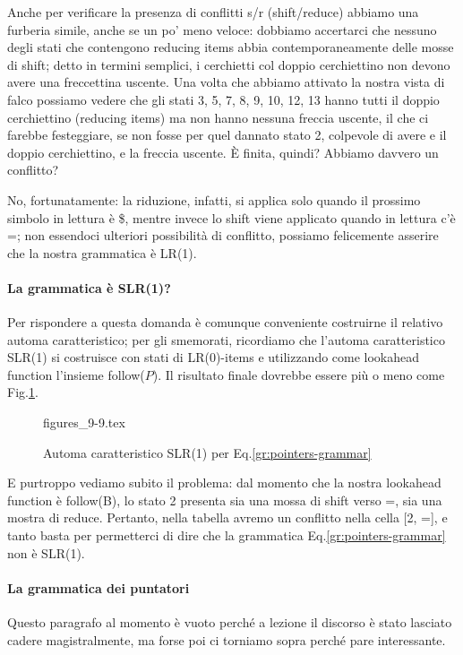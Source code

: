 \documentclass[class=book, crop=false, oneside, 12pt]{standalone}
\begin{document}
Anche per verificare la presenza di conflitti s/r (shift/reduce) abbiamo una furberia simile, anche se un po' meno veloce: dobbiamo accertarci che nessuno degli stati che contengono reducing items abbia contemporaneamente delle mosse di shift; detto in termini semplici, i cerchietti col doppio cerchiettino non devono avere una freccettina uscente. Una volta che abbiamo attivato la nostra vista di falco possiamo vedere che gli stati 3, 5, 7, 8, 9, 10, 12, 13 hanno tutti il doppio cerchiettino (reducing items) ma non hanno nessuna freccia uscente, il che ci farebbe festeggiare, se non fosse per quel dannato stato 2, colpevole di avere e il doppio cerchiettino, e la freccia uscente. È finita, quindi? Abbiamo davvero un conflitto? 

No, fortunatamente: la riduzione, infatti, si applica solo quando il prossimo simbolo in lettura è \$, mentre invece lo shift viene applicato quando in lettura c'è =; non essendoci ulteriori possibilità di conflitto, possiamo felicemente asserire che la nostra grammatica è LR(1).

\paragraph{La grammatica è SLR(1)?}
Per rispondere a questa domanda è comunque conveniente costruirne il relativo automa caratteristico; per gli smemorati, ricordiamo che l'automa caratteristico SLR(1) si costruisce con stati di LR(0)-items e utilizzando come lookahead function l'insieme follow(\(P\)). Il risultato finale dovrebbe essere più o meno come Fig.\ref{fig:pointers-automaton-slr1}.
\begin{figure}[H]
    \centering
	{figures_9-9.tex}
    \caption{Automa caratteristico SLR(1) per Eq.\ref{gr:pointers-grammar}}
    \label{fig:pointers-automaton-slr1}
\end{figure}
E purtroppo vediamo subito il problema: dal momento che la nostra lookahead function è follow(B), lo stato 2 presenta sia una mossa di shift verso =, sia una mostra di reduce. Pertanto, nella tabella avremo un conflitto nella cella [2, =], e tanto basta per permetterci di dire che la grammatica Eq.\ref{gr:pointers-grammar} non è SLR(1).

\paragraph{La grammatica dei puntatori}
Questo paragrafo al momento è vuoto perché a lezione il discorso è stato lasciato cadere magistralmente, ma forse poi ci torniamo sopra perché pare interessante.
\end{document}

